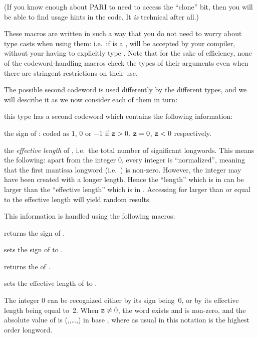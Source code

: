 \noindent
(If you know enough about PARI to need to access the ``clone'' bit, then
you will be able to find usage hints in the code. It \emph{is} technical after
all.)

These macros are written in such a way that you do not need to worry about
type casts when using them: i.e.~if  is a , 
will be accepted by your compiler, without your having to explicitly type
. Note that for the sake of efficiency, none of the
codeword-handling macros check the types of their arguments even when there
are stringent restrictions on their use.

The possible second codeword is used differently by the different types, and
we will describe it as we now consider each of them in turn:


 this type has
a second codeword  which contains the following information:

the sign of : coded as $1$, $0$ or $-1$ if ${\tt z} > 0$, ${\tt z} = 0$,
${\tt z} < 0$ respectively.

the \emph{effective length} of , i.e.~the total number of significant
longwords. This means the following: apart from the integer 0, every integer
is ``normalized'', meaning that the first mantissa longword (i.e.~)
is non-zero. However, the integer may have been created with a longer length.
Hence the ``length'' which is in  can be larger than the
``effective length'' which is in . Accessing  for 
larger than or equal to the effective length will yield random results.

\noindent This information is handled using the following macros:

 returns the sign of .

 sets the sign of  to .

 returns the  of .

 sets the effective length
of  to .

The integer 0 can be recognized either by its sign being~0, or by its
effective length being equal to~2. When ${\tt z} \ne 0$, the word
 exists and is non-zero, and the absolute value of 
is (,,\dots,) in base
, where as usual in this notation  is
the highest order longword.

